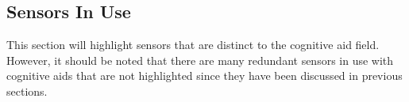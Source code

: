 

\subsection{Sensors In Use}
This section will highlight sensors that are distinct to the cognitive aid field. However, it should be noted that there are many redundant sensors in use with cognitive aids that are not highlighted since they have been discussed in previous sections.



